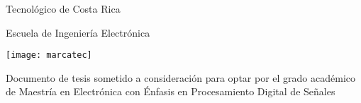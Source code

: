 
\thispagestyle{empty} 

\begin{center}

Tecnológico de Costa Rica

\par\vspace{1ex}

Escuela de Ingeniería Electrónica

\par\vspace{20mm}

\texttt{[image: marcatec]}

\par\vspace*{\fill}

{\large\bf{\scriptTitle}}

\par\vspace*{\fill}

Documento de tesis sometido a consideración para optar por el grado
académico de Maestría en Electrónica con Énfasis en
%
Procesamiento Digital de Señales

\par\vspace{20mm}

\scriptAuthor

\vspace*{\fill}

\end{center}
\newpage 
\cleardoublepage 


